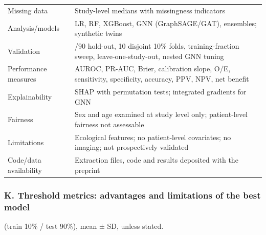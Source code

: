 \documentclass[
  11pt,
]{article}
\begin{document}
\begin{longtable}[]{@{}
  >{\raggedright\arraybackslash}p{}
  >{\raggedright\arraybackslash}p{}@{}}
Missing data & Study-level medians with missingness indicators \\
Analysis/models & LR, RF, XGBoost, GNN (GraphSAGE/GAT), ensembles;
synthetic twins \\
Validation & 10/90 hold-out, 10 disjoint 10\% folds, training-fraction
sweep, leave-one-study-out, nested GNN tuning \\
Performance measures & AUROC, PR-AUC, Brier, calibration slope, O/E,
sensitivity, specificity, accuracy, PPV, NPV, net benefit \\
Explainability & SHAP with permutation tests; integrated gradients for
GNN \\
Fairness & Sex and age examined at study level only; patient-level
fairness not assessable \\
Limitations & Ecological features; no patient-level covariates; no
imaging; not prospectively validated \\
Code/data availability & Extraction files, code and results deposited
with the preprint \\
\end{longtable}

\subsubsection{K. Threshold metrics: advantages and limitations of the
best
model}\label{k.-threshold-metrics-advantages-and-limitations-of-the-best-model}

(train 10\% / test 90\%), mean ± SD, unless stated.
\end{document}
